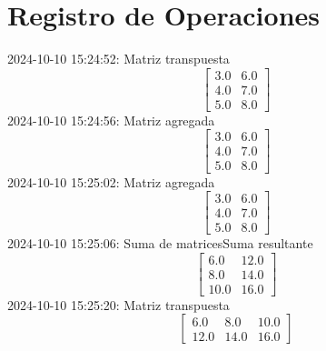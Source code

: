\documentclass{article}%
\begin{document}
%
\normalsize%
\section{Registro de Operaciones}%
\label{sec:RegistrodeOperaciones}%
2024{-}10{-}10 15:24:52: Matriz transpuesta\newline%
%
\[%
\begin{bmatrix} 3.0 & 6.0 \\ 4.0 & 7.0 \\ 5.0 & 8.0 \end{bmatrix}%
\]%
2024{-}10{-}10 15:24:56: Matriz agregada\newline%
%
\[%
\begin{bmatrix} 3.0 & 6.0 \\ 4.0 & 7.0 \\ 5.0 & 8.0 \end{bmatrix}%
\]%
2024{-}10{-}10 15:25:02: Matriz agregada\newline%
%
\[%
\begin{bmatrix} 3.0 & 6.0 \\ 4.0 & 7.0 \\ 5.0 & 8.0 \end{bmatrix}%
\]%
2024{-}10{-}10 15:25:06: Suma de matricesSuma resultante\newline%
%
\[%
\begin{bmatrix} 6.0 & 12.0 \\ 8.0 & 14.0 \\ 10.0 & 16.0 \end{bmatrix}%
\]%
2024{-}10{-}10 15:25:20: Matriz transpuesta\newline%
%
\[%
\begin{bmatrix} 6.0 & 8.0 & 10.0 \\ 12.0 & 14.0 & 16.0 \end{bmatrix}%
\]

%
\end{document}
